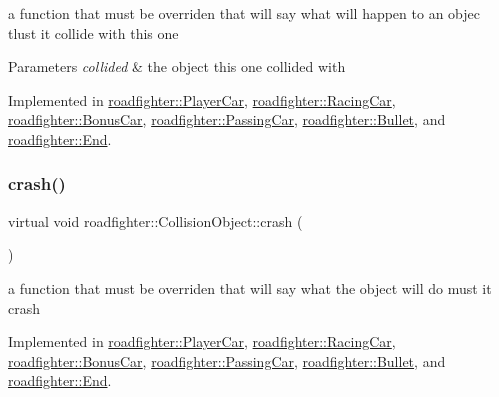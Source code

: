 a function that must be overriden that will say what will happen to an objec tlust it collide with this one 
\begin{DoxyParams}{Parameters}
{\em collided} & the object this one collided with \\
\hline
\end{DoxyParams}


Implemented in \hyperlink{classroadfighter_1_1PlayerCar_ab62e40d949ac12f402fdaaab15c69b81}{roadfighter\+::\+Player\+Car}, \hyperlink{classroadfighter_1_1RacingCar_a1de00cf7c8df548e8ab57a27cefb7345}{roadfighter\+::\+Racing\+Car}, \hyperlink{classroadfighter_1_1BonusCar_ad1ce65b53e5652eac482a7b00c9a1d51}{roadfighter\+::\+Bonus\+Car}, \hyperlink{classroadfighter_1_1PassingCar_a04ee71b75c90f21efef591756855bf37}{roadfighter\+::\+Passing\+Car}, \hyperlink{classroadfighter_1_1Bullet_a36156632331e59c11abf5ae76024bc1f}{roadfighter\+::\+Bullet}, and \hyperlink{classroadfighter_1_1End_a56dfbe6f0c760a5728b58fc9d9f40486}{roadfighter\+::\+End}.

\mbox{\label{classroadfighter_1_1CollisionObject_a18f0f60a5a664d6fb554daac0d398a2c}} 
\subsubsection{\texorpdfstring{crash()}{crash()}}
{\footnotesize\ttfamily virtual void roadfighter\+::\+Collision\+Object\+::crash (\begin{DoxyParamCaption}{ }\end{DoxyParamCaption})\hspace{0.3cm}{\ttfamily [pure virtual]}}

a function that must be overriden that will say what the object will do must it crash 

Implemented in \hyperlink{classroadfighter_1_1PlayerCar_a330d071af729d7afbfcfd7ef92516544}{roadfighter\+::\+Player\+Car}, \hyperlink{classroadfighter_1_1RacingCar_a2f5018f17852d75682afd78e806b8e4c}{roadfighter\+::\+Racing\+Car}, \hyperlink{classroadfighter_1_1BonusCar_aad0a2a41a1b84c6487c1fc204b5f7cb7}{roadfighter\+::\+Bonus\+Car}, \hyperlink{classroadfighter_1_1PassingCar_a5c437fb5164d2735881a469650db048d}{roadfighter\+::\+Passing\+Car}, \hyperlink{classroadfighter_1_1Bullet_ac96121377fffa9ed8ea94c333a841a7a}{roadfighter\+::\+Bullet}, and \hyperlink{classroadfighter_1_1End_af88fbaf5ebd266bd153d0ba3f32ba0f8}{roadfighter\+::\+End}.

